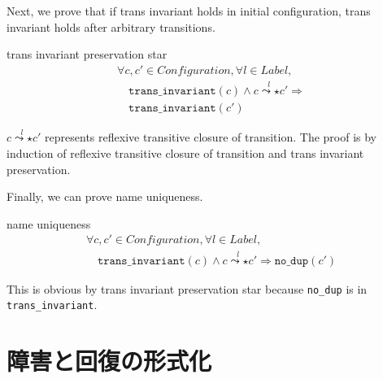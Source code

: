 Next, we prove that if trans invariant holds in initial configuration, trans invariant holds after arbitrary transitions.


\begin{lemma}{trans invariant preservation star}
  \begin{displaymath}
    \begin{array}{l}
      \forall c, c' \in \textit{Configuration}, \forall l \in \textit{Label}, \\
      \quad \texttt{trans\_invariant}(c) \wedge c \overset{l}{\leadsto\star} c' \Rightarrow \\
      \quad \texttt{trans\_invariant}(c')
    \end{array}
  \end{displaymath}
\end{lemma}
$c \overset{l}{\leadsto\star} c'$ represents reflexive transitive closure of transition.
The proof is by induction of reflexive transitive closure of transition and trans invariant preservation.

Finally, we can prove name uniqueness.
\begin{theorem}{name uniqueness}
  \begin{displaymath}
    \begin{array}{l}
      \forall c, c' \in \textit{Configuration}, \forall l \in \textit{Label}, \\
      \quad \texttt{trans\_invariant}(c) \wedge c \overset{l}{\leadsto\star} c' \Rightarrow \texttt{no\_dup}(c')
    \end{array}
  \end{displaymath}
\end{theorem}
This is obvious by trans invariant preservation star because \texttt{no\_dup} is in \texttt{trans\_invariant}.


\section{障害と回復の形式化}
